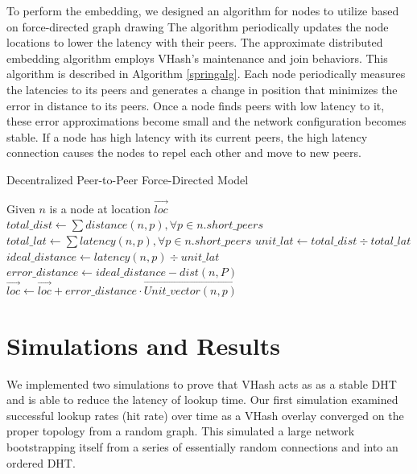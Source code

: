 \documentclass[10pt, conference, letterpaper]{IEEEtran}
\begin{document}
To perform the embedding, we designed an algorithm for nodes to utilize based on force-directed graph drawing \cite{Spring} 
The algorithm periodically updates the node locations to lower the latency with their peers.
The approximate distributed embedding algorithm employs VHash's maintenance and join behaviors.
This algorithm is described in Algorithm \ref{springalg}. 
Each node periodically measures the latencies to its peers and generates a change in position that minimizes the error in distance to its peers.
Once a node finds peers with low latency to it, these error approximations become small and the network configuration becomes stable.
If a node has high latency with its current peers, the high latency connection causes the nodes to repel each other and move to new peers.

\begin{algorithm}
\caption{Decentralized Peer-to-Peer Force-Directed Model}
\label{springalg}
\begin{algorithmic}[1] 
	\STATE Given $n$ is a node at location $\overrightarrow{loc}$
    \STATE $total\_dist \leftarrow \sum distance(n,p),\forall p \in n.short\_peers$
    \STATE $total\_lat \leftarrow \sum latency(n,p),\forall p \in n.short\_peers$
    \STATE $unit\_lat \leftarrow total\_dist \div total\_lat$
    	\STATE $ideal\_distance \leftarrow latency(n,p) \div unit\_lat$
        \STATE $error\_distance \leftarrow ideal\_distance - dist(n,P)$
        \STATE $\overrightarrow{loc} \leftarrow \overrightarrow{loc} + error\_distance \cdot \overrightarrow{Unit\_vector(n,p)} $
    \ENDFOR
\end{algorithmic}
\end{algorithm}






\section{Simulations and Results}
\label{simSection}
We implemented two simulations to prove that VHash acts as as a stable DHT and is able to reduce the latency of lookup time.
Our first simulation examined successful lookup rates (hit rate) over time as a VHash overlay converged on the proper topology from a random graph.  
This simulated a large network bootstrapping itself from a series of essentially random connections and into an ordered DHT.
  
\end{document}
